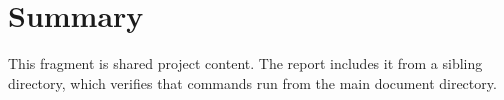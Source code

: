 \section{Summary}

This fragment is shared project content. The report includes it from a sibling
directory, which verifies that commands run from the main document directory.
